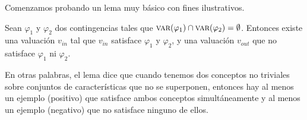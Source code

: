 Comenzamos probando un lema muy básico con fines ilustrativos.
\begin{lemma}\label{lemma:InterseccionUnionConceptos}
Sean $\varphi_1$ y $\varphi_2$ dos contingencias tales que $\textsc{var}(\varphi_1) \cap  \textsc{var}(\varphi_2) = \emptyset$. Entonces existe una valuación $v_{in}$ tal que $v_{in}$ satisface $\varphi_1$ y $\varphi_2$, y una valuación $v_{out}$ que no satisface $\varphi_1$ ni $\varphi_2$.
\end{lemma}
En otras palabras, el lema dice que cuando tenemos dos conceptos no triviales sobre conjuntos de características que no se superponen, entonces hay al menos un ejemplo (positivo) que satisface ambos conceptos simultáneamente y al menos un ejemplo (negativo) que no satisface ninguno de ellos.

